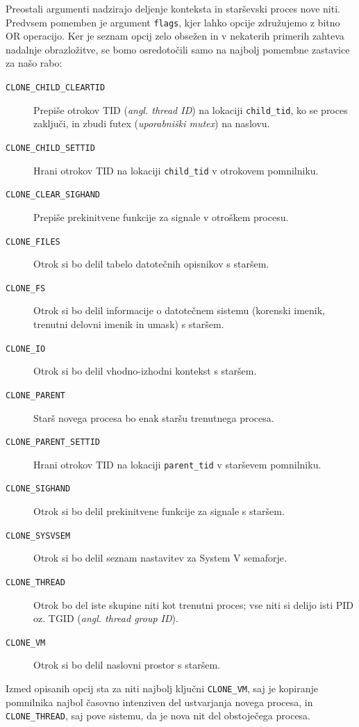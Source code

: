 \documentclass[a4paper,12pt,openright]{book}
\begin{document}
Preostali argumenti nadzirajo deljenje konteksta in starševski proces nove niti.
Predvsem pomemben je argument \texttt{flags}, kjer lahko opcije združujemo z bitno OR operacijo.
Ker je seznam opcij zelo obsežen in v nekaterih primerih zahteva nadalnje obrazložitve, se bomo osredotočili samo na najbolj pomembne zastavice za našo rabo:
\begin{description}
	\item [\texttt{CLONE\_CHILD\_CLEARTID}] Prepiše otrokov TID (\textit{angl. thread ID}) na lokaciji \texttt{child\_tid}, ko se proces zaključi, in zbudi futex (\textit{uporabniški mutex}) na naslovu.
	\item [\texttt{CLONE\_CHILD\_SETTID}] Hrani otrokov TID na lokaciji \texttt{child\_tid} v otrokovem pomnilniku.
	\item [\texttt{CLONE\_CLEAR\_SIGHAND}] Prepiše prekinitvene funkcije za signale v otroškem procesu.
	\item [\texttt{CLONE\_FILES}] Otrok si bo delil tabelo datotečnih opisnikov s staršem.
	\item [\texttt{CLONE\_FS}] Otrok si bo delil informacije o datotečnem sistemu (korenski imenik, trenutni delovni imenik in umask) s staršem.
	\item [\texttt{CLONE\_IO}] Otrok si bo delil vhodno-izhodni kontekst s staršem.
	\item [\texttt{CLONE\_PARENT}] Starš novega procesa bo enak staršu trenutnega procesa.
	\item [\texttt{CLONE\_PARENT\_SETTID}] Hrani otrokov TID na lokaciji \texttt{parent\_tid} v starševem pomnilniku.
	\item [\texttt{CLONE\_SIGHAND}] Otrok si bo delil prekinitvene funkcije za signale s staršem.
	\item [\texttt{CLONE\_SYSVSEM}] Otrok si bo delil seznam nastavitev za System V semaforje.
	\item [\texttt{CLONE\_THREAD}] Otrok bo del iste skupine niti kot trenutni proces; vse niti si delijo isti PID oz. TGID (\textit{angl. thread group ID}).
	\item [\texttt{CLONE\_VM}] Otrok si bo delil naslovni prostor s staršem.
\end{description}

Izmed opisanih opcij sta za niti najbolj ključni \texttt{CLONE\_VM}, saj je kopiranje pomnilnika najbol časovno intenziven del ustvarjanja novega procesa, in \texttt{CLONE\_THREAD}, saj pove sistemu, da je nova nit del obstoječega procesa.
\end{document}

